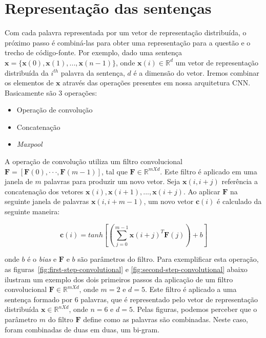 \section{Representação das sentenças}
\label{sec:representacao-sentenca}

Com cada palavra representada por um vetor de representação distribuída, o próximo passo é combiná-las para obter uma representação para a questão e o trecho de código-fonte. Por exemplo, dado uma sentença $\bm{x} = \{ \bm{x}(0), \bm{x}(1), . . ., \bm{x}(n - 1) \}$, onde $\bm{x}(i) \in \mathbb{R}^{d}$ um vetor de representação distribuída da $i^{th}$ palavra da sentença, $d$ é a dimensão do vetor. Iremos combinar os elementos de $\bm{x}$ através das operações presentes em nossa arquitetura CNN. Basicamente são 3 operações:

\begin{itemize}
    \item Operação de convolução
    \item Concatenação
    \item \textit{Maxpool}
\end{itemize}

A operação de convolução utiliza um filtro convolucional $\bm{F}  = [\bm{F}(0),· · ·, \bm{F}(m - 1)]$, tal que $\bm{F} \in \mathbb{R}^{m X d}$. Este filtro é aplicado em uma janela de $m$ palavras para produzir um novo vetor.
Seja $\bm{x}(i, i + j)$ referência a concatenação dos vetores $\bm{x}(i), \bm{x}(i + 1), . . ., \bm{x}(i + j)$. Ao aplicar $\bm{F}$ na seguinte janela de palavras $\bm{x}(i, i + m - 1)$, um novo vetor $\bm{c}(i)$ é calculado da seguinte maneira:

\begin{equation}\label{eq:calc_convolution_ci}
    \bm{c}(i) = tanh \left[\left(\sum_{j=0}^{m - 1} \bm{x}(i + j)^{T}\bm{F}(j)\right) + b\right]
\end{equation}

onde $b$ é o \textit{bias} e $\bm{F}$ e $b$ são parâmetros do filtro. Para exemplificar esta operação, as figuras~\ref{fig:first-step-convolutional} e \ref{fig:second-step-convolutional} abaixo ilustram um exemplo dos dois primeiros passos da aplicação de um filtro convolucional $\bm{F} \in \mathbb{R}^{m X d}$, onde $m = 2$ e $d = 5$. Este filtro é aplicado a uma sentença formado por 6 palavras, que é representado pelo vetor de representação distribuída $\bm{x} \in \mathbb{R}^{n X d}$, onde $n = 6$ e $d = 5$. Pelas figuras, podemos perceber que o parâmetro $m$ do filtro $\bm{F}$ define como as palavras são combinadas. Neste caso, foram combinadas de duas em duas, um bi-gram.

